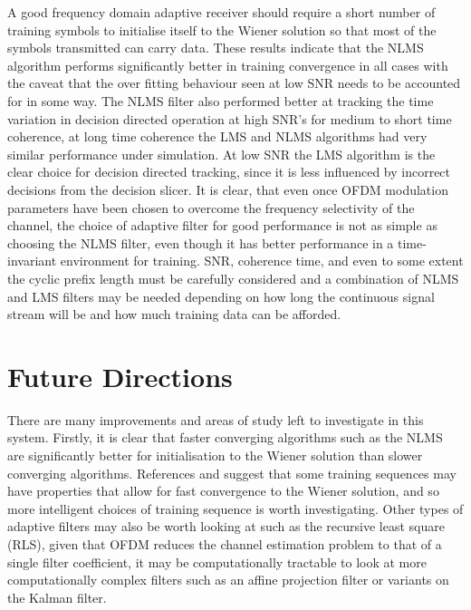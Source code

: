 A good frequency domain adaptive receiver should require a short %
number of training symbols to initialise itself to the Wiener solution so that %
most of the symbols transmitted can carry data. These results indicate %
that the NLMS algorithm performs significantly better in training convergence %
in all cases with the caveat that the over fitting behaviour seen %
at low SNR needs to be accounted for in some way. The NLMS filter %
also performed better at tracking the time variation in decision directed %
operation at high SNR's for medium to short time coherence, at long %
time coherence the LMS and NLMS algorithms had very similar performance %
under simulation. At low SNR the LMS algorithm is the clear choice %
for decision directed tracking, since it is less influenced by incorrect %
decisions from the decision slicer. It is clear, that even once OFDM %
modulation parameters have been chosen to overcome the %
frequency selectivity of the channel, the choice of adaptive %
filter for good performance is not as simple as choosing the %
NLMS filter, even though it has better performance in a %
time-invariant environment for training. SNR, coherence time, %
and even to some extent the cyclic prefix length must be %
carefully considered and a combination of NLMS and LMS %
filters may be needed depending on how long the continuous %
signal stream will be and how much training data can %
be afforded.

\section{Future Directions}

There are many improvements and areas of study left to %
investigate in this system. Firstly, it is clear that faster %
converging algorithms such as the NLMS are significantly %
better for initialisation to the Wiener solution than slower %
converging algorithms. References \cite{Qureshi77} and %
\cite{Crozier91} suggest that some training sequences %
may have properties that allow for fast convergence %
to the Wiener solution, and so more intelligent choices of %
training sequence is worth investigating. Other types of %
adaptive filters may also be worth looking at such %
as the recursive least square (RLS), given that %
OFDM reduces the channel estimation problem to that %
of a single filter coefficient, it may be computationally %
tractable to look at more computationally complex filters %
such as an affine projection filter or variants on the Kalman %
filter. 

